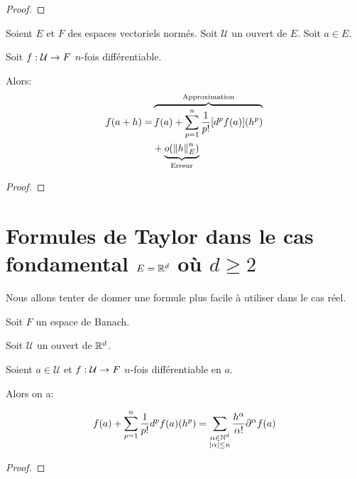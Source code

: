 \ifdefined\outputproof
\begin{proof}

\end{proof}
\fi


\begin{theorem}
	\label{theorem:taylor_young_formula}
	Soient $E$ et $F$ des espaces vectoriels normés. Soit $\mathcal{U}$ un
	ouvert de $E$. Soit $a \in E$.

	Soit $f : \mathcal{U} \rightarrow F$ $n$-fois différentiable.

	Alors:
	\begin{align*}
		f(a + h) = & \overbrace{f(a) + \displaystyle \sum_{p = 1}^{n} \frac{1}{p!}
		[d^{p}f(a)] (h^{p})}^{\text{Approximation}} \\
		& + \underbrace{o(\norm{h}_{E}^{n})}_{\text{Erreur}}
	\end{align*}
\end{theorem}

\ifdefined\outputproof
\begin{proof}
\end{proof}
\fi

\section{Formules de Taylor dans le cas fondamental $E = \mathbb{R}^{d}$ où $d \geq
2$}

Nous allons tenter de donner une formule plus facile à utiliser dans le cas
réel.


\begin{theorem} 
	\label{theorem:taylor_formula_real_case}
	Soit $F$ un espace de Banach.

	Soit $\mathcal{U}$ un ouvert de $\mathbb{R}^{d}$.

	Soient $a \in \mathcal{U}$ et $f : \mathcal{U} \rightarrow F$ $n$-fois
	différentiable en $a$.

	Alors on a:

	\begin{equation*}
		f(a) + \displaystyle \sum_{p = 1}^{n} \frac{1}{p!} d^{p}f(a)(h^{p}) =
		\sum_{\substack{\alpha \in \mathbb{N}^{d} \\ |\alpha| \leq n}}
		\frac{h^{\alpha}}{\alpha !} \partial^{\alpha}f(a)
	\end{equation*}
\end{theorem}

\ifdefined\outputproof
\begin{proof}

\end{proof}
\fi

